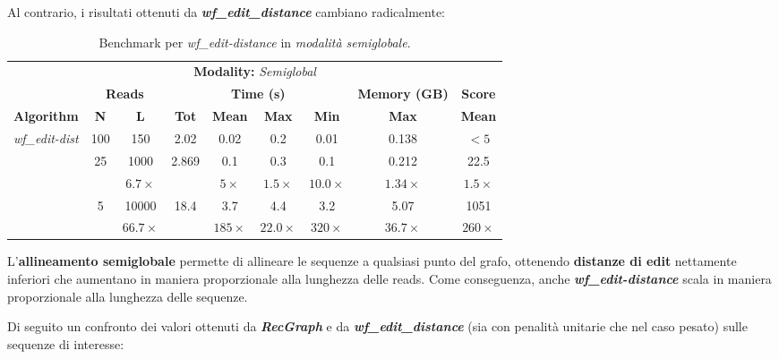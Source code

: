     Al contrario, i risultati ottenuti da \textbf{\textit{wf\_edit\_distance}} cambiano radicalmente:
    \vspace{20pt}
    \begin{table}[h]
        \centering
        \begin{tabular}{|c|c|c|c|c|c|c|c|c|}
            \hline
                \multicolumn{9}{|c|}{\multirow{2}{*}{\textbf{Modality:} \emph{Semiglobal}}} \\
                \multicolumn{9}{|c|}{} \\
            \hline
                & \multicolumn{2}{|c|}{\textbf{Reads}} & \multicolumn{4}{|c|}{\textbf{Time (s)}} & \textbf{Memory (GB)} & \textbf{Score} \\
            \hline
                \textbf{Algorithm} & \textbf{N} & \textbf{L} & \textbf{Tot} & \textbf{Mean} & \textbf{Max} & \textbf{Min} & \textbf{Max} & \textbf{Mean} \\
            \hline
                \multirow{4}{*}{\emph{wf\_edit-dist}} & 100 & 150 & 2.02 & 0.02 & 0.2 & 0.01 & 0.138 & $<5$ \\
            \cline{2-9}
                & \multirow{2}{*}{25} & 1000 & \multirow{2}{*}{2.869} & 0.1 & 0.3 & 0.1 & 0.212 & 22.5 \\
                & & $6.7 \times$ & & $5 \times$ & $1.5 \times$ & $10.0 \times$ & $1.34 \times$ & $1.5 \times$ \\
            \cline{2-9}
                & \multirow{2}{*}{5} & 10000 & \multirow{2}{*}{18.4} & 3.7 & 4.4 & 3.2 & 5.07 & 1051 \\
                & & $66.7 \times$ & & $185 \times$ & $22.0 \times$ & $320 \times$ & $36.7 \times$ & $260 \times$\\
            \hline
        \end{tabular}
        \caption{Benchmark per \emph{wf\_edit-distance} in \emph{modalità semiglobale}.}
        \label{tab:benchmark_wf_edit-dist_semiglobal}
    \end{table}
    \vspace{20pt}

    L'\textbf{allineamento semiglobale} permette di allineare le sequenze a qualsiasi punto del grafo, ottenendo \textbf{distanze di edit} nettamente inferiori che aumentano in maniera proporzionale alla lunghezza delle reads. Come conseguenza, anche \textbf{\textit{wf\_edit-distance}} scala in maniera proporzionale alla lunghezza delle sequenze. 

    \vspace{20pt}
    Di seguito un confronto dei valori ottenuti da \textbf{\textit{RecGraph}} e da \textbf{\textit{wf\_edit\_distance}} (sia con penalità unitarie che nel caso pesato) sulle sequenze di interesse:

